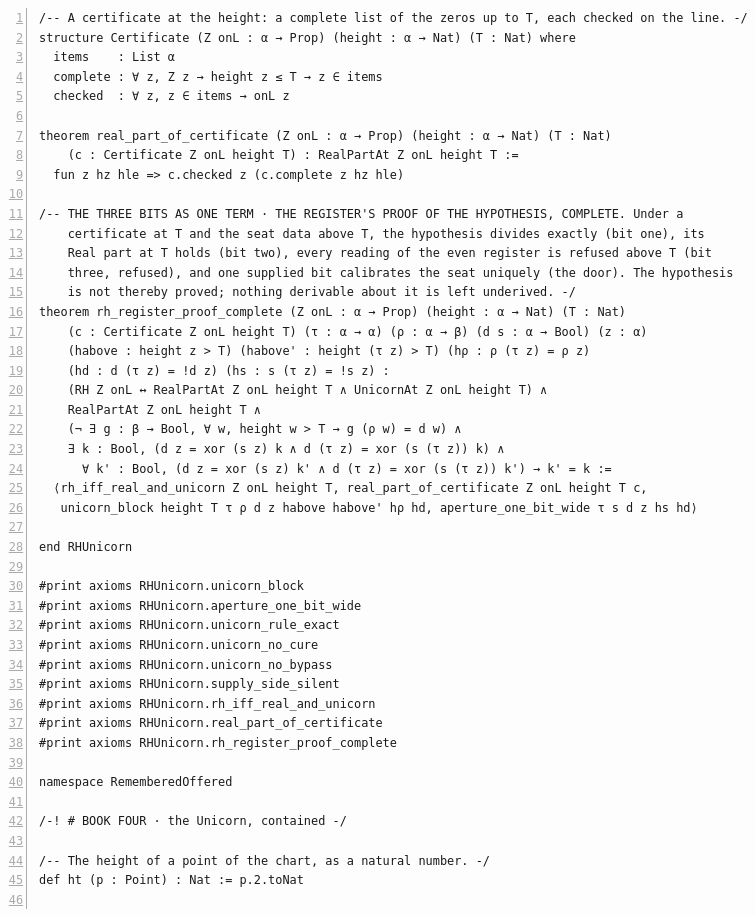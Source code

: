 \documentclass[10pt]{article}
\newcommand{\leansize}{\fontsize{5.5pt}{6.75pt}\selectfont}
\begin{document}
\begin{multicols}{2}
\begin{Verbatim}[numbers=left,firstnumber=1,numbersep=3pt,xleftmargin=2.6em,breaklines=true,breakanywhere=true,breakautoindent=false,breakindent=1.4em,breaksymbolleft={},breakanywheresymbolpre={},fontsize=\leansize]
/-- A certificate at the height: a complete list of the zeros up to T, each checked on the line. -/
structure Certificate (Z onL : α → Prop) (height : α → Nat) (T : Nat) where
  items    : List α
  complete : ∀ z, Z z → height z ≤ T → z ∈ items
  checked  : ∀ z, z ∈ items → onL z

theorem real_part_of_certificate (Z onL : α → Prop) (height : α → Nat) (T : Nat)
    (c : Certificate Z onL height T) : RealPartAt Z onL height T :=
  fun z hz hle => c.checked z (c.complete z hz hle)

/-- THE THREE BITS AS ONE TERM · THE REGISTER'S PROOF OF THE HYPOTHESIS, COMPLETE. Under a
    certificate at T and the seat data above T, the hypothesis divides exactly (bit one), its
    Real part at T holds (bit two), every reading of the even register is refused above T (bit
    three, refused), and one supplied bit calibrates the seat uniquely (the door). The hypothesis
    is not thereby proved; nothing derivable about it is left underived. -/
theorem rh_register_proof_complete (Z onL : α → Prop) (height : α → Nat) (T : Nat)
    (c : Certificate Z onL height T) (τ : α → α) (ρ : α → β) (d s : α → Bool) (z : α)
    (habove : height z > T) (habove' : height (τ z) > T) (hρ : ρ (τ z) = ρ z)
    (hd : d (τ z) = !d z) (hs : s (τ z) = !s z) :
    (RH Z onL ↔ RealPartAt Z onL height T ∧ UnicornAt Z onL height T) ∧
    RealPartAt Z onL height T ∧
    (¬ ∃ g : β → Bool, ∀ w, height w > T → g (ρ w) = d w) ∧
    ∃ k : Bool, (d z = xor (s z) k ∧ d (τ z) = xor (s (τ z)) k) ∧
      ∀ k' : Bool, (d z = xor (s z) k' ∧ d (τ z) = xor (s (τ z)) k') → k' = k :=
  ⟨rh_iff_real_and_unicorn Z onL height T, real_part_of_certificate Z onL height T c,
   unicorn_block height T τ ρ d z habove habove' hρ hd, aperture_one_bit_wide τ s d z hs hd⟩

end RHUnicorn

#print axioms RHUnicorn.unicorn_block
#print axioms RHUnicorn.aperture_one_bit_wide
#print axioms RHUnicorn.unicorn_rule_exact
#print axioms RHUnicorn.unicorn_no_cure
#print axioms RHUnicorn.unicorn_no_bypass
#print axioms RHUnicorn.supply_side_silent
#print axioms RHUnicorn.rh_iff_real_and_unicorn
#print axioms RHUnicorn.real_part_of_certificate
#print axioms RHUnicorn.rh_register_proof_complete

namespace RememberedOffered

/-! # BOOK FOUR · the Unicorn, contained -/

/-- The height of a point of the chart, as a natural number. -/
def ht (p : Point) : Nat := p.2.toNat


\end{Verbatim}
\end{multicols}
\end{document}
